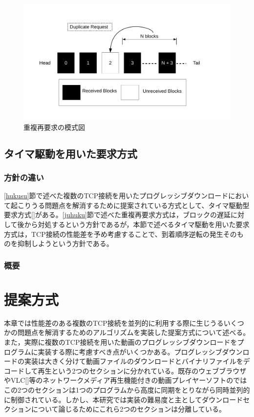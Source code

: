 \documentclass[a4j,12pt]{gradthesis_utf8}
\begin{document}
 \begin{figure}[h]
 	\centering
 	\includegraphics[width=18cm]{block_dup.pdf}
 	\caption{重複再要求の模式図}
 	\label{blockdup}
 \end{figure}

\newpage
 
 
 \section{タイマ駆動を用いた要求方式}
 \subsection{方針の違い}
 \ref{hukusu}節で述べた複数のTCP接続を用いたプログレッシブダウンロードにおいて起こりうる問題点を解消するために提案されている方式として、タイマ駆動型要求方式[]がある。\ref{juhuku}節で述べた重複再要求方式は，ブロックの遅延に対して後から対処するという方針であるが，本節で述べるタイマ駆動を用いた要求方式は，TCP接続の性能差を予め考慮することで、到着順序逆転の発生そのものを抑制しようという方針である。
 \subsection{概要}
 
\chapter{提案方式}\label{sec:sec3}
本章では性能差のある複数のTCP接続を並列的に利用する際に生じうるいくつかの問題点を解消するためのアルゴリズムを実装した提案方式について述べる。\\
また，実際に複数のTCP接続を用いた動画のプログレッシブダウンロードをプログラムに実装する際に考慮すべき点がいくつかある。プログレッシブダウンロードの実装は大きく分けて動画ファイルのダウンロードとバイナリファイルをデコードして再生という2つのセクションに分かれている。既存のウェブブラウザやVLC[]等のネットワークメディア再生機能付きの動画プレイヤーソフトのではこの2つのセクションは1つのプログラムから高度に同期をとりながら同時並列的に制御されている。しかし、本研究では実装の難易度と主としてダウンロードセクションについて論じるためにこれら2つのセクションは分離している。
\end{document}
